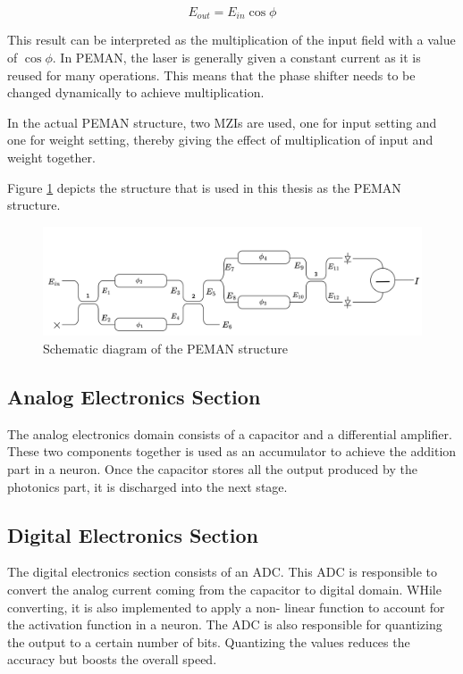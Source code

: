 \begin{equation}
	E_{out} = E_{in}\cos \phi
\end{equation}

This result can be interpreted as the multiplication of the input field with a value of $\cos \phi$. In PEMAN, the laser is generally given a constant current as it is reused for many operations. This means that the phase shifter needs to be changed dynamically to achieve multiplication.

In the actual PEMAN structure, two MZIs are used, one for input setting and one for weight setting, thereby giving the effect of multiplication of input and weight together.

Figure \ref{propPEMAN} depicts the structure that is used in this thesis as the PEMAN structure.

\begin{figure}
	\centering
	\includegraphics[width=\textwidth]{images/propPEMAN.png}
	\caption{Schematic diagram of the PEMAN structure}
	\label{propPEMAN}
\end{figure}

\subsection{Analog Electronics Section}

The analog electronics domain consists of a capacitor and a differential amplifier. These two components together is used as an accumulator to achieve the addition part in a neuron. Once the capacitor stores all the output produced by the photonics part, it is discharged into the next stage.

\subsection{Digital Electronics Section}

The digital electronics section consists of an ADC. This ADC is responsible to convert the analog current coming from the capacitor to digital domain. WHile converting, it is also implemented to apply a non- linear function to account for the activation function in a neuron. The ADC is also responsible for quantizing the output to a certain number of bits. Quantizing the values reduces the accuracy but boosts the overall speed.

